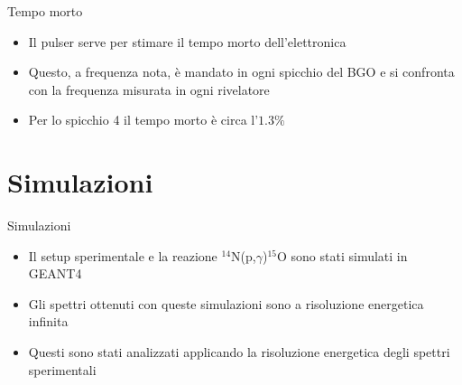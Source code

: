 \documentclass [xcolor=svgnames] {beamer}
\begin{document}
\begin{frame}{Tempo morto}%
	\begin{itemize}
		\item<1-> Il pulser serve per stimare il tempo morto dell'elettronica
		\item<2-> Questo, a frequenza nota, è mandato in ogni spicchio del BGO e si confronta con la frequenza misurata in ogni rivelatore
		\item<3-> Per lo spicchio 4 il tempo morto è circa l'$\mathbf{1.3\%}$ 
	\end{itemize}
\end{frame}











\section{Simulazioni}

\begin{frame}{Simulazioni}
	\begin{itemize}
		\item<1-> Il setup sperimentale e la reazione $^{14}$N(p,$\gamma$)$^{15}$O sono stati simulati in GEANT4
		\item<2-> Gli spettri ottenuti con queste simulazioni sono a risoluzione energetica infinita
		\item<3-> Questi sono stati analizzati applicando la risoluzione energetica degli spettri sperimentali
	\end{itemize}
\end{frame}
\end{document}
